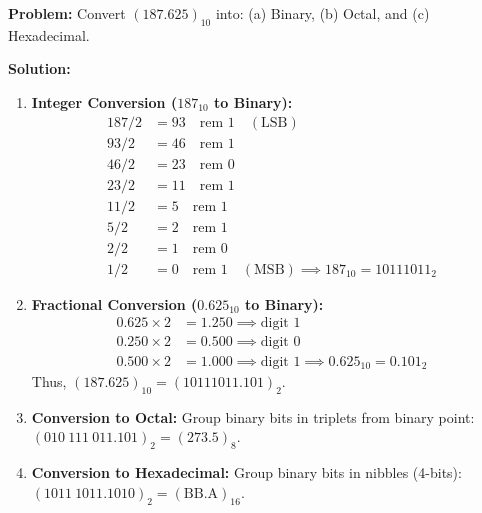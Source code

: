 \begin{examplebox}
\textbf{Problem:} Convert $(187.625)_{10}$ into: (a) Binary, (b) Octal, and (c) Hexadecimal.

\textbf{Solution:}
\begin{enumerate}
    \item \textbf{Integer Conversion ($187_{10}$ to Binary):}
    \begin{align*}
    187 / 2 &= 93 \quad \text{rem } 1 \quad (\text{LSB}) \\
    93 / 2 &= 46 \quad \text{rem } 1 \\
    46 / 2 &= 23 \quad \text{rem } 0 \\
    23 / 2 &= 11 \quad \text{rem } 1 \\
    11 / 2 &= 5 \quad \text{rem } 1 \\
    5 / 2 &= 2 \quad \text{rem } 1 \\
    2 / 2 &= 1 \quad \text{rem } 0 \\
    1 / 2 &= 0 \quad \text{rem } 1 \quad (\text{MSB}) \implies 187_{10} = 10111011_2
    \end{align*}
    \item \textbf{Fractional Conversion ($0.625_{10}$ to Binary):}
    \begin{align*}
    0.625 \times 2 &= 1.250 \implies \text{digit } 1 \\
    0.250 \times 2 &= 0.500 \implies \text{digit } 0 \\
    0.500 \times 2 &= 1.000 \implies \text{digit } 1 \implies 0.625_{10} = 0.101_2
    \end{align*}
    Thus, $(187.625)_{10} = (10111011.101)_2$.
    \item \textbf{Conversion to Octal:}
    Group binary bits in triplets from binary point: $(010\ 111\ 011 . 101)_2 = (273.5)_8$.
    \item \textbf{Conversion to Hexadecimal:}
    Group binary bits in nibbles (4-bits): $(1011\ 1011 . 1010)_2 = (\text{BB.A})_{16}$.
\end{enumerate}
\end{examplebox}

